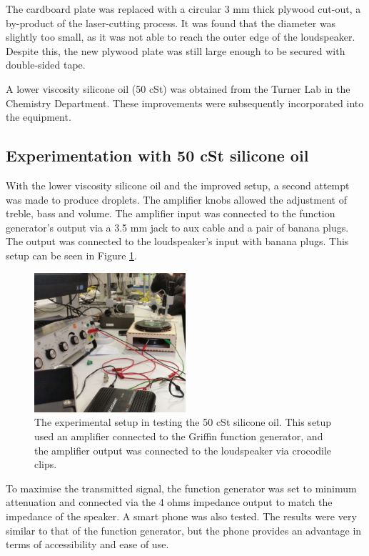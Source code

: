 The cardboard plate was replaced with a circular 3 mm thick plywood cut-out, a by-product of the laser-cutting process. It was found that the diameter was slightly too small, as it was not able to reach the outer edge of the loudspeaker. Despite this, the new plywood plate was still large enough to be secured with double-sided tape. 

A lower viscosity silicone oil (50 cSt) was obtained from the Turner Lab in the Chemistry Department. These improvements were subsequently incorporated into the equipment.

\subsection{Experimentation with 50 cSt silicone oil}
With the lower viscosity silicone oil and the improved setup, a second attempt was made to produce droplets. The amplifier knobs allowed the adjustment of treble, bass and volume. The amplifier input was connected to the function generator's output via a 3.5 mm jack to aux cable and a pair of banana plugs. The output was connected to the loudspeaker's input with banana plugs. This setup can be seen in Figure \ref{fig:exp_setup_sideshot}.

\begin{figure}[ht]
\includegraphics[width=0.5\textwidth]{prototype/exp_rep_imgs/exp_setup_sideshot.jpg}
\centering
\caption{The experimental setup in testing the 50 cSt silicone oil. This setup used an amplifier connected to the Griffin function generator, and the amplifier output was connected to the loudspeaker via crocodile clips.  }
\centering
\label{fig:exp_setup_sideshot}
\end{figure}

To maximise the transmitted signal, the function generator was set to minimum attenuation and connected via the 4 ohms impedance output to match the impedance of the speaker. A smart phone was also tested. The results were very similar to that of the function generator, but the phone provides an advantage in terms of accessibility and ease of use.

